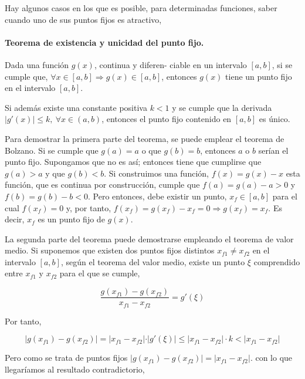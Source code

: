 Hay algunos casos en los que  es posible, para determinadas funciones, saber cuando uno de sus puntos fijos es atractivo,

\paragraph{Teorema de existencia y unicidad del punto fijo.} Dada una función $g(x)$,  continua y diferen-\- ciable en un intervalo $[a, b]$, si se cumple que, $\forall x \in [a, b] \Rightarrow g(x)\in [a,b]$,  entonces $g(x)$ tiene un punto fijo en el intervalo $[a, b]$. 

Si además existe una constante positiva $k < 1$  y se  cumple que  la derivada $\vert g'(x) \vert \leq k, \  \forall x \in (a, b)$, entonces el punto fijo contenido en $[a,b]$ es único. 

Para demostrar la primera parte del teorema, se puede emplear el teorema de Bolzano. Si se cumple que $g(a)=a$ o que  $g(b)=b$, entonces $a$ o $b$ serían el punto fijo. Supongamos que no es así;  entonces tiene que cumplirse que $g(a)>a$ y que $g(b)<b$. Si construimos una función, $f(x)=g(x)-x$ esta función, que es continua por construcción, cumple que $f(a)=g(a)-a>0$ y $f(b)=g(b)-b<0$. Pero entonces, debe existir un punto, $x_f \in [a, b]$ para el cual $f(x_f)=0$ y, por tanto, $f(x_f)=g(x_f)-x_f=0 \Rightarrow g(x_f)=x_f$. Es decir, $x_f$ es un punto fijo de $g(x)$.

La segunda parte del teorema puede demostrarse empleando el teorema de valor medio. Si suponemos  que existen dos puntos fijos distintos $x_{f1} \neq x_{f2}$ en el intervalo $[a,b]$, según el teorema del valor medio, existe un punto $\xi$ comprendido entre $x_{f1}$ y $ x_{f2}$ para el que se cumple,

\begin{equation*}
\frac{g(x_{f1})-g(x_{f2})}{x_{f1}-x_{f2}}=g'(\xi)
\end{equation*}

Por tanto,

\begin{equation*}
\vert g(x_{f1})-g(x_{f2}) \vert =\vert x_{f1}-x_{f2} \vert\cdot \vert g'(\xi) \vert \leq \vert x_{f1}-x_{f2} \vert \cdot k < \vert x_{f1}-x_{f2} \vert 
\end{equation*}

Pero como se trata de puntos fijos $\vert g(x_{f1})-g(x_{f2}) \vert =\vert x_{f1}-x_{f2}\vert $. con lo que llegaríamos al resultado contradictorio, 

